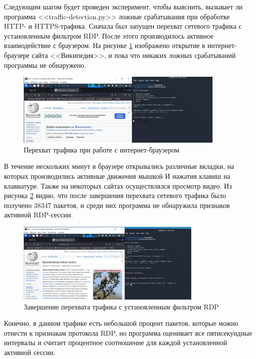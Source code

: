 \documentclass[bachelor, och, coursework]{SCWorks}
\begin{document}
Следующим шагом будет проведен эксперимент, чтобы выяснить, вызывает ли программа <<traffic-detection.py>> ложные срабатывания 
при обработке HTTP- и HTTPS-трафика. Сначала был запущен перехват сетевого трафика с установленным фильтром RDP. После этого
производилось активное взаимодействие с браузером. На рисунке \ref{http} изображено открытие в интернет-браузере сайта <<Википедия>>, и
пока что никаких ложных срабатываний программы не обнаружено.

\begin{figure}[H]
  \centering
  \includegraphics[width=0.9\textwidth]{photo/http.jpg}
  \caption{Перехват трафика при работе с интернет-браузером}
  \label{http}
\end{figure}

В течение нескольких минут в браузере открывались различные вкладки, на которых производились активные движения мышкой И
нажатия клавиш на клавиатуре. Также на некоторых сайтах осуществлялся просмотр видео. 
Из рисунка \ref{http1} видно, что после завершения перехвата сетевого трафика было получено 38347 пакетов, и среди них программа 
не обнаружила признаков активной RDP-сессии. 

\begin{figure}[H]
  \centering
  \includegraphics[width=0.8\textwidth]{photo/http2.jpg}
  \caption{Завершение перехвата трафика с установленным фильтром RDP}
  \label{http1}
\end{figure}

Конечно, в данном трафике есть небольшой процент пакетов, которые можно отнести к признакам протокола RDP,
но программа оценивает все пятисекундные интервалы и считает процентное соотношение для каждой установленной активной сессии.
\end{document}
